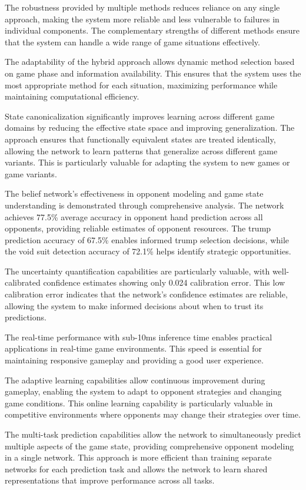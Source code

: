 \documentclass[conference]{IEEEtran}
\begin{document}
The robustness provided by multiple methods reduces reliance on any single approach, making the system more reliable and less vulnerable to failures in individual components. The complementary strengths of different methods ensure that the system can handle a wide range of game situations effectively.

The adaptability of the hybrid approach allows dynamic method selection based on game phase and information availability. This ensures that the system uses the most appropriate method for each situation, maximizing performance while maintaining computational efficiency.

State canonicalization significantly improves learning across different game domains by reducing the effective state space and improving generalization. The approach ensures that functionally equivalent states are treated identically, allowing the network to learn patterns that generalize across different game variants. This is particularly valuable for adapting the system to new games or game variants.

The belief network's effectiveness in opponent modeling and game state understanding is demonstrated through comprehensive analysis. The network achieves 77.5\% average accuracy in opponent hand prediction across all opponents, providing reliable estimates of opponent resources. The trump prediction accuracy of 67.5\% enables informed trump selection decisions, while the void suit detection accuracy of 72.1\% helps identify strategic opportunities.

The uncertainty quantification capabilities are particularly valuable, with well-calibrated confidence estimates showing only 0.024 calibration error. This low calibration error indicates that the network's confidence estimates are reliable, allowing the system to make informed decisions about when to trust its predictions.

The real-time performance with sub-10ms inference time enables practical applications in real-time game environments. This speed is essential for maintaining responsive gameplay and providing a good user experience.

The adaptive learning capabilities allow continuous improvement during gameplay, enabling the system to adapt to opponent strategies and changing game conditions. This online learning capability is particularly valuable in competitive environments where opponents may change their strategies over time.

The multi-task prediction capabilities allow the network to simultaneously predict multiple aspects of the game state, providing comprehensive opponent modeling in a single network. This approach is more efficient than training separate networks for each prediction task and allows the network to learn shared representations that improve performance across all tasks.
\end{document}
